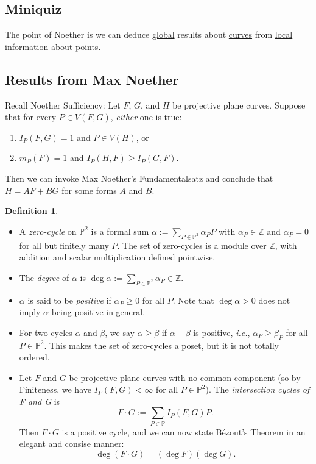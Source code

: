 \documentclass[12pt]{article}
\newcommand{\z}{\mathbb{Z}}
\newcommand{\ita}[1]{\textit{#1}}
\theoremstyle{definition}
\newtheorem{definition}[theorem]{Definition}
\begin{document}
\subsection{Miniquiz}
The point of Noether is we can deduce \underline{global} results about \underline{curves} from \underline{local} information about \underline{points}.
\subsection{Results from Max Noether}
Recall Noether Sufficiency: Let $F$, $G$, and $H$ be projective plane curves. Suppose that for every $P\in V(F,G)$, \ita{either} one is true:
\begin{enumerate}
    \item $I_P(F,G)=1$ and $P\in V(H)$, or
    \item $m_P(F)=1$ and $I_P(H,F)\geq I_P(G,F)$.
\end{enumerate}
Then we can invoke Max Noether's Fundamentalsatz and conclude that $H=AF+BG$ for some forms $A$ and $B$.
\begin{definition}
    \begin{itemize}
        \item A \ita{zero-cycle} on $\mathbb{P}^2$ is a formal sum $\alpha:=\sum\limits_{P\in\mathbb{P}^2}\alpha_PP$ with $\alpha_P\in\z$ and $\alpha_P=0$ for all but finitely many $P$. The set of zero-cycles is a module over $\z$, with addition and scalar multiplication defined pointwise.
        \item The \ita{degree} of $\alpha$ is $\deg\alpha:=\sum\limits_{P\in\mathbb{P}^2}\alpha_P\in\z$.
        \item $\alpha$ is said to be \ita{positive} if $\alpha_P\geq0$ for all $P$. Note that $\deg\alpha>0$ does not imply $\alpha$ being positive in general.
        \item For two cycles $\alpha$ and $\beta$, we say $\alpha\geq\beta$ if $\alpha-\beta$ is positive, \ita{i.e.}, $\alpha_P\geq\beta_P$ for all $P\in\mathbb{P}^2$. This makes the set of zero-cycles a poset, but it is not totally ordered.
        \item Let $F$ and $G$ be projective plane curves with no common component (so by Finiteness, we have $I_P(F,G)<\infty$ for all $P\in\mathbb{P}^2$). The \ita{intersection cycles of F and G} is 
        \begin{equation}
            F\cdot G:=\sum\limits_{P\in\mathbb{P}}I_P(F,G)P.
        \end{equation}
        Then $F\cdot G$ is a positive cycle, and we can now state B\'ezout's Theorem in an elegant and consise manner:
        \begin{equation}
            \boxed{\deg(F\cdot G)=(\deg F)(\deg G).}
        \end{equation}
    \end{itemize}
\end{definition}
\end{document}
